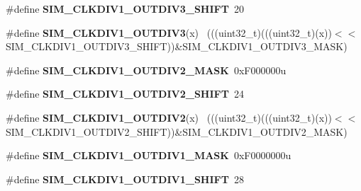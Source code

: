 \begin{DoxyCompactItemize}
\item 
\hypertarget{group___s_i_m___register___masks_gab5533e40e65e365a9bb32edf707ac9f0}{}\#define {\bfseries S\+I\+M\+\_\+\+C\+L\+K\+D\+I\+V1\+\_\+\+O\+U\+T\+D\+I\+V3\+\_\+\+S\+H\+I\+F\+T}~20\label{group___s_i_m___register___masks_gab5533e40e65e365a9bb32edf707ac9f0}

\item 
\hypertarget{group___s_i_m___register___masks_gab0713008e430907e25383f8d6039b331}{}\#define {\bfseries S\+I\+M\+\_\+\+C\+L\+K\+D\+I\+V1\+\_\+\+O\+U\+T\+D\+I\+V3}(x)                                  ~(((uint32\+\_\+t)(((uint32\+\_\+t)(x))$<$$<$S\+I\+M\+\_\+\+C\+L\+K\+D\+I\+V1\+\_\+\+O\+U\+T\+D\+I\+V3\+\_\+\+S\+H\+I\+F\+T))\&S\+I\+M\+\_\+\+C\+L\+K\+D\+I\+V1\+\_\+\+O\+U\+T\+D\+I\+V3\+\_\+\+M\+A\+S\+K)\label{group___s_i_m___register___masks_gab0713008e430907e25383f8d6039b331}

\item 
\hypertarget{group___s_i_m___register___masks_gad2d7b5c991f6db7ab2a3e6bc4d9c6aae}{}\#define {\bfseries S\+I\+M\+\_\+\+C\+L\+K\+D\+I\+V1\+\_\+\+O\+U\+T\+D\+I\+V2\+\_\+\+M\+A\+S\+K}~0x\+F000000u\label{group___s_i_m___register___masks_gad2d7b5c991f6db7ab2a3e6bc4d9c6aae}

\item 
\hypertarget{group___s_i_m___register___masks_ga6d6fd31143c3871c916062966b6fbc3b}{}\#define {\bfseries S\+I\+M\+\_\+\+C\+L\+K\+D\+I\+V1\+\_\+\+O\+U\+T\+D\+I\+V2\+\_\+\+S\+H\+I\+F\+T}~24\label{group___s_i_m___register___masks_ga6d6fd31143c3871c916062966b6fbc3b}

\item 
\hypertarget{group___s_i_m___register___masks_gaf350f750c79647611f0919014ff04037}{}\#define {\bfseries S\+I\+M\+\_\+\+C\+L\+K\+D\+I\+V1\+\_\+\+O\+U\+T\+D\+I\+V2}(x)                                  ~(((uint32\+\_\+t)(((uint32\+\_\+t)(x))$<$$<$S\+I\+M\+\_\+\+C\+L\+K\+D\+I\+V1\+\_\+\+O\+U\+T\+D\+I\+V2\+\_\+\+S\+H\+I\+F\+T))\&S\+I\+M\+\_\+\+C\+L\+K\+D\+I\+V1\+\_\+\+O\+U\+T\+D\+I\+V2\+\_\+\+M\+A\+S\+K)\label{group___s_i_m___register___masks_gaf350f750c79647611f0919014ff04037}

\item 
\hypertarget{group___s_i_m___register___masks_ga1bd42e75000e91999a7d8c2f94a9b606}{}\#define {\bfseries S\+I\+M\+\_\+\+C\+L\+K\+D\+I\+V1\+\_\+\+O\+U\+T\+D\+I\+V1\+\_\+\+M\+A\+S\+K}~0x\+F0000000u\label{group___s_i_m___register___masks_ga1bd42e75000e91999a7d8c2f94a9b606}

\item 
\hypertarget{group___s_i_m___register___masks_ga2d45b701595bf4f2bc6a451508f94c25}{}\#define {\bfseries S\+I\+M\+\_\+\+C\+L\+K\+D\+I\+V1\+\_\+\+O\+U\+T\+D\+I\+V1\+\_\+\+S\+H\+I\+F\+T}~28\label{group___s_i_m___register___masks_ga2d45b701595bf4f2bc6a451508f94c25}


\end{DoxyCompactItemize}
